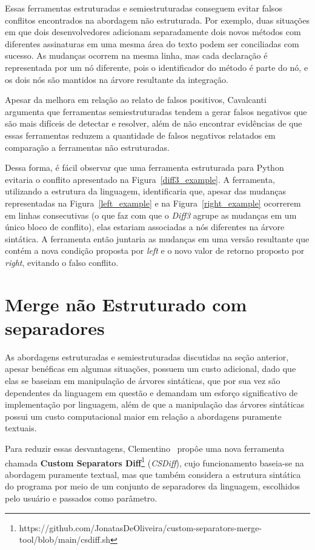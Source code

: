 Essas ferramentas estruturadas e semiestruturadas conseguem evitar falsos
conflitos encontrados na abordagem não estruturada. Por exemplo, duas situações
em que dois desenvolvedores adicionam separadamente dois novos métodos com
diferentes assinaturas em uma mesma área do texto podem ser conciliadas com
sucesso. As mudanças ocorrem na mesma linha, mas cada declaração é representada
por um nó diferente, pois o identificador do método é parte do nó, e os dois
nós são mantidos na árvore resultante da integração.

Apesar da melhora em relação ao relato de falsos positivos,
Cavalcanti~\cite{cavalcanti17} argumenta que ferramentas semiestruturadas tendem
a gerar falsos negativos que são mais difíceis de detectar e resolver, além de
não encontrar evidências de que essas ferramentas reduzem a quantidade de
falsos negativos relatados em comparação a ferramentas não estruturadas.

Dessa forma, é fácil observar que uma ferramenta estruturada para Python
evitaria o conflito apresentado na Figura~\ref{diff3_example}. A ferramenta,
utilizando a estrutura da linguagem, identificaria que, apesar das mudanças
representadas na Figura~\ref{left_example} e na Figura~\ref{right_example}
ocorrerem em linhas consecutivas (o que faz com que o \emph{Diff3} agrupe as
mudanças em um único bloco de conflito), elas estariam associadas a nós
diferentes na árvore sintática. A ferramenta então juntaria as mudanças em uma
versão resultante que contém a nova condição proposta por \emph{left} e o novo
valor de retorno proposto por \emph{right}, evitando o falso conflito.

\section{Merge não Estruturado com separadores}

As abordagens estruturadas e semiestruturadas discutidas na seção anterior,
apesar benéficas em algumas situações, possuem um custo adicional, dado que elas se
baseiam em manipulação de árvores sintáticas, que por sua vez são dependentes
da linguagem em questão e demandam um esforço significativo de implementação
por linguagem, além de que a manipulação das árvores sintáticas possui um custo
computacional maior em relação a abordagens puramente textuais.

Para reduzir essas desvantagens, Clementino~\cite{clem21} propôe uma nova
ferramenta chamada \textbf{Custom Separators
Diff}\footnote{https://github.com/JonatasDeOliveira/custom-separators-merge-tool/blob/main/csdiff.sh}
(\emph{CSDiff}), cujo funcionamento baseia-se na abordagem puramente textual,
mas que também considera a estrutura sintática do programa por meio de um
conjunto de separadores da linguagem, escolhidos pelo usuário e passados como
parâmetro.

